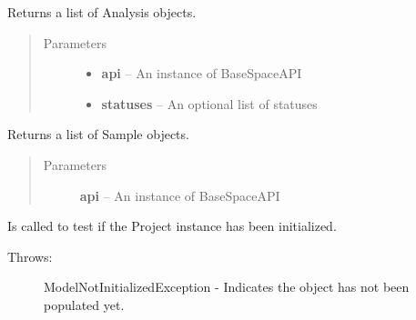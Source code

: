 \documentclass[letterpaper,10pt,english]{sphinxmanual}
\begin{document}
\begin{fulllineitems}

\begin{fulllineitems}
\label{Available modules:BaseSpacePy.model.Project.Project.getAppResults}
Returns a list of Analysis objects.
\begin{quote}\begin{description}
\item[{Parameters}] \leavevmode\begin{itemize}
\item {} 
\textbf{api} -- An instance of BaseSpaceAPI

\item {} 
\textbf{statuses} -- An optional list of statuses

\end{itemize}

\end{description}\end{quote}

\end{fulllineitems}


\begin{fulllineitems}
\label{Available modules:BaseSpacePy.model.Project.Project.getSamples}
Returns a list of Sample objects.
\begin{quote}\begin{description}
\item[{Parameters}] \leavevmode
\textbf{api} -- An instance of BaseSpaceAPI

\end{description}\end{quote}

\end{fulllineitems}


\begin{fulllineitems}
\label{Available modules:BaseSpacePy.model.Project.Project.isInit}
Is called to test if the Project instance has been initialized.
\begin{description}
\item[{Throws:}] \leavevmode
ModelNotInitializedException - Indicates the object has not been populated yet.

\end{description}

\end{fulllineitems}


\end{fulllineitems}
\end{document}
